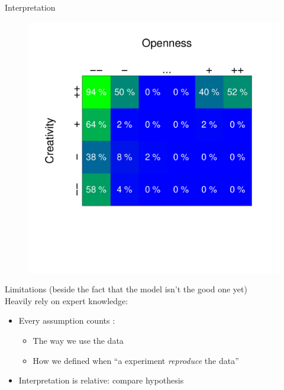 \documentclass[12pt, notes=show]{beamer}
\begin{document}
\begin{frame}{Interpretation}
    \begin{figure}
	\includegraphics[width=.65\textwidth]{images/heatmapSimuProba.pdf}\\
	\centering
    \end{figure}

\end{frame}


\begin{frame}{Limitations}
    {\tiny(beside the fact that the model isn't the good one yet)\\}
    \vspace{1cm}
    Heavily rely on expert knowledge:
    \begin{itemize}
	\item Every assumption counts :
	    \begin{itemize}
		\item The way we use the data
		\item How we defined when ``a experiment \emph{reproduce} the data''
	    \end{itemize}
	\item Interpretation is relative: compare hypothesis
    \end{itemize}

\end{frame}
\end{document}
